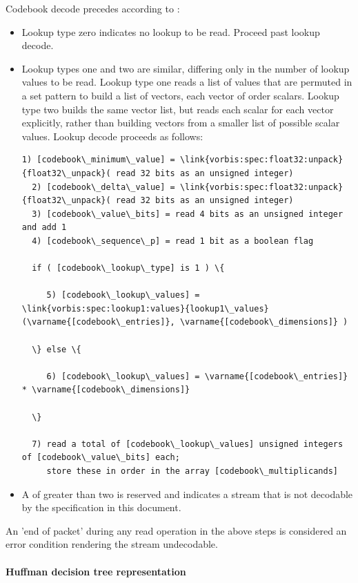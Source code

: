 Codebook decode precedes according to :
\begin{itemize}
\item
Lookup type zero indicates no lookup to be read.  Proceed past
lookup decode.
\item
Lookup types one and two are similar, differing only in the
number of lookup values to be read.  Lookup type one reads a list of
values that are permuted in a set pattern to build a list of vectors,
each vector of order  scalars.  Lookup
type two builds the same vector list, but reads each scalar for each
vector explicitly, rather than building vectors from a smaller list of
possible scalar values.  Lookup decode proceeds as follows:

\begin{Verbatim}[commandchars=\\\{\}]
  1) [codebook\_minimum\_value] = \link{vorbis:spec:float32:unpack}{float32\_unpack}( read 32 bits as an unsigned integer)
  2) [codebook\_delta\_value] = \link{vorbis:spec:float32:unpack}{float32\_unpack}( read 32 bits as an unsigned integer)
  3) [codebook\_value\_bits] = read 4 bits as an unsigned integer and add 1
  4) [codebook\_sequence\_p] = read 1 bit as a boolean flag

  if ( [codebook\_lookup\_type] is 1 ) \{

     5) [codebook\_lookup\_values] = \link{vorbis:spec:lookup1:values}{lookup1\_values}(\varname{[codebook\_entries]}, \varname{[codebook\_dimensions]} )

  \} else \{

     6) [codebook\_lookup\_values] = \varname{[codebook\_entries]} * \varname{[codebook\_dimensions]}

  \}

  7) read a total of [codebook\_lookup\_values] unsigned integers of [codebook\_value\_bits] each;
     store these in order in the array [codebook\_multiplicands]
\end{Verbatim}
\item
A  of greater than two is reserved
and indicates a stream that is not decodable by the specification in this
document.

\end{itemize}


An 'end of packet' during any read operation in the above steps is
considered an error condition rendering the stream undecodable.

\paragraph{Huffman decision tree representation}

